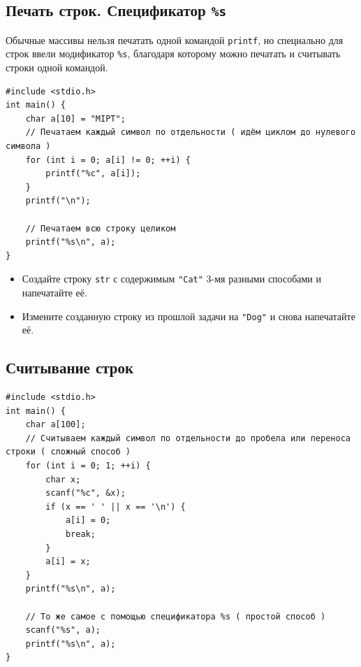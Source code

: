 \documentclass{article}
\begin{document}
\subsection*{Печать строк. Спецификатор \texttt{\%s}}
Обычные массивы нельзя печатать одной командой \texttt{printf}, но специально для строк ввели модификатор \texttt{\%s}, благодаря которому можно печатать и считывать строки одной командой.
\begin{lstlisting}
#include <stdio.h>
int main() {
    char a[10] = "MIPT";
    // Печатаем каждый символ по отдельности ( идём циклом до нулевого символа )
    for (int i = 0; a[i] != 0; ++i) {
        printf("%c", a[i]);
    }
    printf("\n");
	
    // Печатаем всю строку целиком
    printf("%s\n", a);
}
\end{lstlisting}

\begin{itemize}
\item Создайте строку \texttt{str} с содержимым \texttt{"Cat"} 3-мя разными способами и напечатайте её.
\item Измените созданную строку из прошлой задачи на \texttt{"Dog"} и снова напечатайте её.
\end{itemize}

\newpage
\subsection*{Считывание строк}
\begin{lstlisting}
#include <stdio.h>
int main() {
    char a[100];
    // Считываем каждый символ по отдельности до пробела или переноса строки ( сложный способ )
    for (int i = 0; 1; ++i) {
        char x;
        scanf("%c", &x);
        if (x == ' ' || x == '\n') {
            a[i] = 0;
            break;
        }
        a[i] = x;
    }
    printf("%s\n", a);
    
    // То же самое с помощью спецификатора %s ( простой способ )
    scanf("%s", a);
    printf("%s\n", a);
}
\end{lstlisting}
\end{document}

